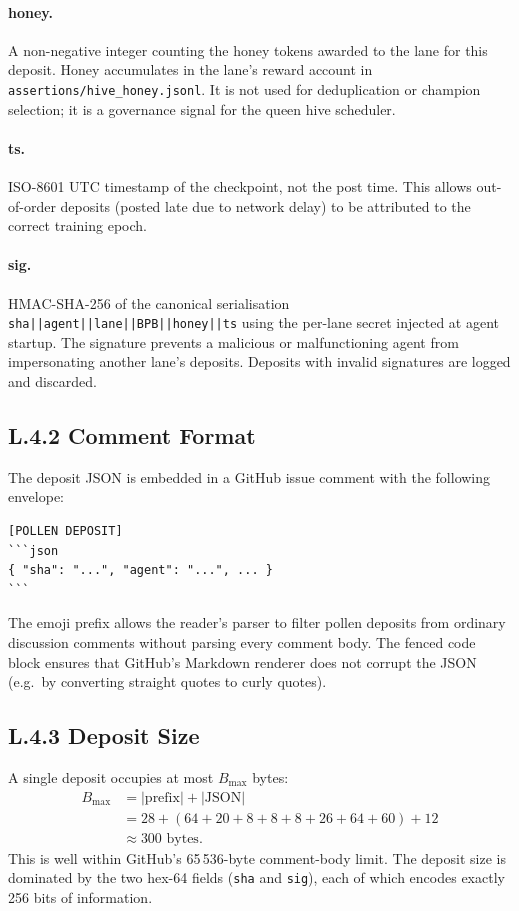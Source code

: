 \paragraph{honey.}
A non-negative integer counting the honey tokens awarded to the
lane for this deposit.  Honey accumulates in the lane's reward
account in \texttt{assertions/hive\_honey.jsonl}.  It is not used for
deduplication or champion selection; it is a governance signal for
the queen hive scheduler.

\paragraph{ts.}
ISO-8601 UTC timestamp of the checkpoint, not the post time.  This
allows out-of-order deposits (posted late due to network delay) to be
attributed to the correct training epoch.

\paragraph{sig.}
HMAC-SHA-256 of the canonical serialisation
\texttt{sha||agent||lane||BPB||honey||ts} using the per-lane secret
injected at agent startup.  The signature prevents a malicious or
malfunctioning agent from impersonating another lane's deposits.
Deposits with invalid signatures are logged and discarded.

\subsection*{L.4.2 \quad Comment Format}

The deposit JSON is embedded in a GitHub issue comment with the
following envelope:

\begin{verbatim}
[POLLEN DEPOSIT]
```json
{ "sha": "...", "agent": "...", ... }
```
\end{verbatim}

The emoji prefix allows the reader's parser to filter pollen deposits
from ordinary discussion comments without parsing every comment body.
The fenced code block ensures that GitHub's Markdown renderer does not
corrupt the JSON (e.g.\ by converting straight quotes to curly quotes).

\subsection*{L.4.3 \quad Deposit Size}

A single deposit occupies at most $B_{\max}$ bytes:
\begin{align}
  B_{\max} &= |\text{prefix}| + |\text{JSON}| \nonumber \\
           &= 28 + (64 + 20 + 8 + 8 + 8 + 26 + 64 + 60) + 12 \nonumber \\
           &\approx 300 \text{ bytes}.
\end{align}
This is well within GitHub's 65\,536-byte comment-body limit.  The
deposit size is dominated by the two hex-64 fields (\texttt{sha} and
\texttt{sig}), each of which encodes exactly 256 bits of information.

